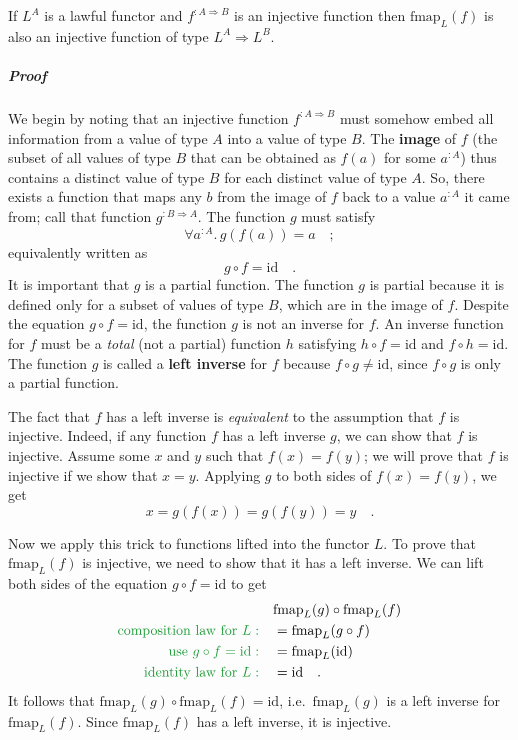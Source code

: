 If $L^{A}$ is a lawful functor and $f^{:A\Rightarrow B}$ is an injective
function then $\text{fmap}_{L}(f)$ is also an injective function
of type $L^{A}\Rightarrow L^{B}$. 

\subparagraph{Proof}

We begin by noting that an injective function $f^{:A\Rightarrow B}$
must somehow embed all information from a value of type $A$ into
a value of type $B$. The \textbf{image} of $f$ (the subset of all
values of type $B$ that can be obtained as $f(a)$ for some $a^{:A}$)
thus contains a distinct value of type $B$ for each distinct value
of type $A$. So, there exists a function that maps any $b$ from
the image of $f$ back to a value $a^{:A}$ it came from; call that
function $g^{:B\Rightarrow A}$. The function $g$ must satisfy 
\[
\forall a^{:A}.\,g(f(a))=a\quad;
\]
equivalently written as 
\[
g\circ f=\text{id}\quad.
\]
It is important that $g$ is a partial function.
The function $g$ is partial because it is defined only for a subset
of values of type $B$, which are in the image of $f$. Despite the
equation $g\circ f=\text{id}$, the function $g$ is not an inverse
for $f$. An inverse function for $f$ must
be a \emph{total} (not a partial) function $h$ satisfying $h\circ f=\text{id}$
and $f\circ h=\text{id}$. The function $g$ is called a \textbf{left
inverse} for $f$ because $f\circ g\neq\text{id}$,
since $f\circ g$ is only a partial function.

The fact that $f$ has a left inverse is \emph{equivalent} to the
assumption that $f$ is injective. Indeed, if any function $f$ has
a left inverse $g$, we can show that $f$ is injective. Assume some
$x$ and $y$ such that $f(x)=f(y)$; we will prove that $f$ is injective
if we show that $x=y$. Applying $g$ to both sides of $f(x)=f(y)$,
we get
\[
x=g(f(x))=g(f(y))=y\quad.
\]

Now we apply this trick to functions lifted into the functor $L$.
To prove that $\text{fmap}_{L}(f)$ is injective, we need to show
that it has a left inverse. We can lift both sides of the equation
$g\circ f=\text{id}$ to get
\begin{align*}
 & \text{fmap}_{L}(g)\circ\text{fmap}_{L}(f)\\
{\color{greenunder}\text{composition law for }L:}\quad & =\text{fmap}_{L}(g\circ f)\\
{\color{greenunder}\text{use }g\circ f=\text{id}:}\quad & =\text{fmap}_{L}(\text{id})\\
{\color{greenunder}\text{identity law for }L:}\quad & =\text{id}\quad.
\end{align*}
It follows that $\text{fmap}_{L}(g)\circ\text{fmap}_{L}(f)=\text{id}$,
i.e.~$\text{fmap}_{L}(g)$ is a left inverse for $\text{fmap}_{L}(f)$.
Since $\text{fmap}_{L}(f)$ has a left inverse, it is injective.


